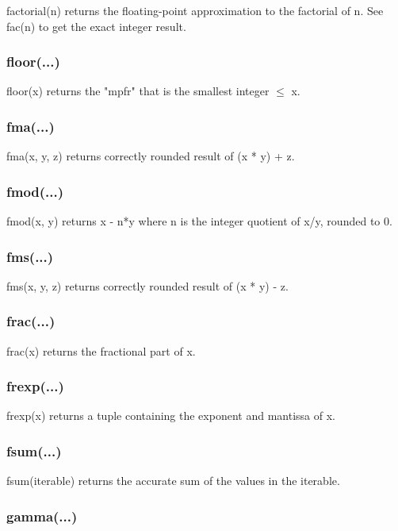 factorial(n) returns the floating-point approximation to the factorial of n.
See fac(n) to get the exact integer result.

\subsubsection{floor(...)}

floor(x) returns the "mpfr" that is the smallest integer $\le$ x.

\subsubsection{fma(...)}

fma(x, y, z) returns correctly rounded result of (x * y) + z.

\subsubsection{fmod(...)}

fmod(x, y) returns x - n*y where n is the integer quotient of x/y, rounded to 0.

\subsubsection{fms(...)}

fms(x, y, z) returns correctly rounded result of (x * y) - z.

\subsubsection{frac(...)}

frac(x) returns the fractional part of x.

\subsubsection{frexp(...)}

frexp(x) returns a tuple containing the exponent and mantissa of x.

\subsubsection{fsum(...)}

fsum(iterable) returns the accurate sum of the values in the iterable.

\subsubsection{gamma(...)}

